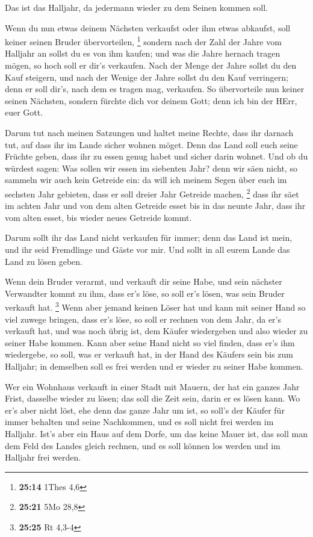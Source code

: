  Das ist das Halljahr, da jedermann wieder zu dem Seinen
kommen soll.

 Wenn du nun etwas deinem Nächsten verkaufst oder ihm etwas
abkaufst, soll keiner seinen Bruder übervorteilen, \footnote{\textbf{25:14}
  1Thes 4,6}  sondern nach der Zahl der Jahre vom Halljahr
an sollst du es von ihm kaufen; und was die Jahre hernach tragen mögen,
so hoch soll er dir's verkaufen.  Nach der Menge der Jahre
sollst du den Kauf steigern, und nach der Wenige der Jahre sollst du den
Kauf verringern; denn er soll dir's, nach dem es tragen mag, verkaufen.
 So übervorteile nun keiner seinen Nächsten, sondern
fürchte dich vor deinem Gott; denn ich bin der HErr, euer Gott.

 Darum tut nach meinen Satzungen und haltet meine Rechte,
dass ihr darnach tut, auf dass ihr im Lande sicher wohnen möget.
 Denn das Land soll euch seine Früchte geben, dass ihr zu
essen genug habet und sicher darin wohnet.  Und ob du
würdest sagen: Was sollen wir essen im siebenten Jahr? denn wir säen
nicht, so sammeln wir auch kein Getreide ein:  da will ich
meinem Segen über euch im sechsten Jahr gebieten, dass er soll dreier
Jahr Getreide machen, \footnote{\textbf{25:21} 5Mo 28,8} 
dass ihr säet im achten Jahr und von dem alten Getreide esset bis in das
neunte Jahr, dass ihr vom alten esset, bis wieder neues Getreide kommt.

 Darum sollt ihr das Land nicht verkaufen für immer; denn
das Land ist mein, und ihr seid Fremdlinge und Gäste vor mir.
 Und sollt in all eurem Lande das Land zu lösen geben.

 Wenn dein Bruder verarmt, und verkauft dir seine Habe, und
sein nächster Verwandter kommt zu ihm, dass er's löse, so soll er's
lösen, was sein Bruder verkauft hat. \footnote{\textbf{25:25} Rt 4,3-4}
 Wenn aber jemand keinen Löser hat und kann mit seiner Hand
so viel zuwege bringen, dass er's löse,  so soll er rechnen
von dem Jahr, da er's verkauft hat, und was noch übrig ist, dem Käufer
wiedergeben und also wieder zu seiner Habe kommen.  Kann
aber seine Hand nicht so viel finden, dass er's ihm wiedergebe, so soll,
was er verkauft hat, in der Hand des Käufers sein bis zum Halljahr; in
demselben soll es frei werden und er wieder zu seiner Habe kommen.

 Wer ein Wohnhaus verkauft in einer Stadt mit Mauern, der
hat ein ganzes Jahr Frist, dasselbe wieder zu lösen; das soll die Zeit
sein, darin er es lösen kann.  Wo er's aber nicht löst, ehe
denn das ganze Jahr um ist, so soll's der Käufer für immer behalten und
seine Nachkommen, und es soll nicht frei werden im Halljahr.
 Ist's aber ein Haus auf dem Dorfe, um das keine Mauer ist,
das soll man dem Feld des Landes gleich rechnen, und es soll können los
werden und im Halljahr frei werden.

